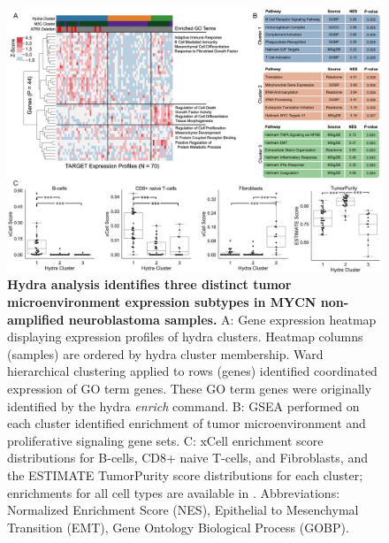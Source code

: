 \documentclass[10pt,letterpaper]{article}
\begin{document}
\begin{figure}[!h]
	\includegraphics[width=\textwidth]{img/PNG/MYCN-NA-Figure-V5@2x}
	\caption{{\bf Hydra analysis identifies three distinct tumor microenvironment expression subtypes in MYCN non-amplified neuroblastoma samples.}
	A: Gene expression heatmap displaying expression profiles of hydra clusters. Heatmap columns (samples) are ordered by hydra cluster membership. Ward hierarchical clustering applied to rows (genes) identified coordinated expression of GO term genes. These GO term genes were originally identified by the hydra \textit{enrich} command. B: GSEA performed on each cluster identified enrichment of tumor microenvironment and proliferative signaling gene sets. C: xCell enrichment score distributions for B-cells, CD8+ naive T-cells, and Fibroblasts, and the ESTIMATE TumorPurity score distributions for each cluster; enrichments for all cell types are available in . Abbreviations: Normalized Enrichment Score (NES), Epithelial to Mesenchymal Transition (EMT), Gene Ontology Biological Process (GOBP).
	\label{MYCN-NA}}
\end{figure}
\end{document}
